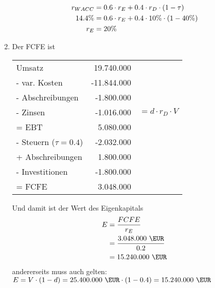 \documentclass{article}
\begin{document}
\begin{enumerate}[label=(\alph*)]
\begin{align}
			r_{WACC} &= 0.6\cdot r_E + 0.4\cdot r_D \cdot (1-\tau) \notag \\
			14.4\% &= 0.6\cdot r_E + 0.4\cdot 10\%\cdot (1-40\%) \notag \\
			r_E &= 20\% \notag
		\end{align}
		\item Der FCFE ist
		\begin{center}
			\begin{tabular}{l|rl}
				Umsatz & 19.740.000 \EUR & \\
				- var. Kosten & -11.844.000 \EUR & \\
				- Abschreibungen & -1.800.000 \EUR & \\
				- Zinsen & -1.016.000 \EUR & $=d\cdot r_D\cdot V$ \\
				\hline
				= EBT & 5.080.000 \EUR & \\
				- Steuern ($\tau=0.4$) & -2.032.000 \EUR & \\
				+ Abschreibungen & 1.800.000 \EUR & \\
				- Investitionen & -1.800.000 \EUR & \\
				\hline
				= FCFE & 3.048.000 \EUR &
			\end{tabular}
		\end{center}
		Und damit ist der Wert des Eigenkapitals
		\begin{align}
			E &= \frac{FCFE}{r_E} \notag \\
			&= \frac{3.048.000\text{ \EUR}}{0.2} \notag \\
			&= 15.240.000\text{ \EUR} \notag
		\end{align}
		andererseits muss auch gelten: $E=V\cdot (1-d)= 25.400.000\text{ \EUR}\cdot (1-0.4) = 15.240.000\text{ \EUR}$ \checkmark
	\end{enumerate}
	
\end{document}
